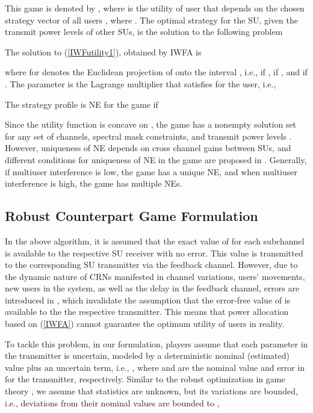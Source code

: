 \documentclass[peerreview,onecolumn,11pt,draftclsnofoot]{IEEEtran}\usepackage{amsmath}\usepackage{amsfonts}\usepackage{epsfig}\usepackage{amssymb}\usepackage{graphicx}\usepackage{amssymb,amsmath}\usepackage{cite}\usepackage{color,soul}\newcommand\T{\rule{0pt}{3.1ex}}
\begin{document}
This game is denoted by , where  is the utility of user  that depends on the chosen strategy vector of all users  , where
. The optimal strategy for the
 SU, given the transmit power levels of other SUs, is the solution to the following
problem


The solution to (\ref{IWFutility1}), obtained by IWFA is

where   for  denotes the Euclidean projection
of  onto the interval , i.e.,  if ,  if , and  if . The parameter  is the Lagrange multiplier that satisfies  for the  user, i.e.,

The strategy profile
 is NE for the game  if

Since the utility function  is concave on , the game  has a nonempty solution set for any set of channels, spectral mask constraints, and transmit power levels \cite{NEexistence}. However, uniqueness of NE depends on cross channel gains between SUs, and different conditions for uniqueness of NE in the game  are proposed in \cite{Nash1}. Generally, if multiuser interference is low, the game has a unique NE, and when multiuser interference is high, the game has multiple NEs.

\subsection{Robust Counterpart Game Formulation}
In the above algorithm, it is assumed that the exact value of  for each subchannel is available to the respective SU receiver with no error. This value is transmitted to the corresponding SU transmitter via the feedback channel. However, due to the dynamic nature of CRNs manifested in channel variations, users' movements, new users in the system, as well as the delay in the feedback channel, errors are introduced in , which invalidate the assumption that the error-free value of  is available to the the respective transmitter. This means that power allocation based on (\ref{IWFA}) cannot guarantee the optimum utility of users in reality.

To tackle this problem, in our formulation, players assume that each parameter in the transmitter is uncertain, modeled by a deterministic nominal (estimated) value plus an uncertain term, i.e.,
,
where  and  are the nominal
value and error in   for the 
transmitter, respectively. Similar to the robust optimization in game theory \cite{Robustgame}, we assume that 
statistics are unknown, but its variations are bounded, i.e., deviations from their nominal values are bounded to  ,
 
\end{document}

